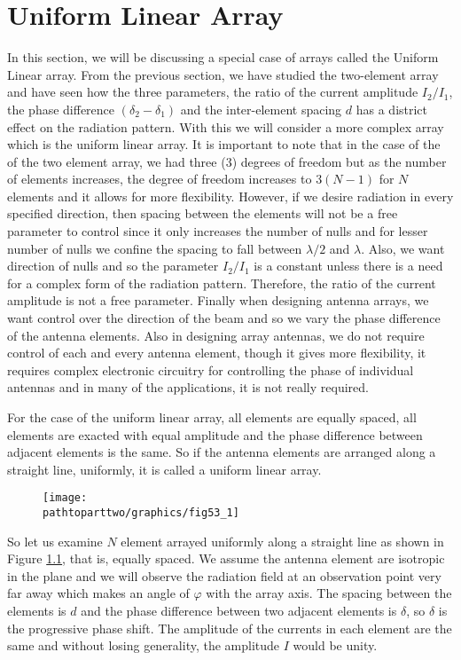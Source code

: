 \chapter{Uniform Linear Array}
In this section, we will be discussing a special case of arrays called the Uniform Linear array. From the previous section, we have studied the two-element array and have seen how the three parameters, the ratio of the current amplitude $I_{2} / I_{1}$, the phase difference $\left(\delta_2 - \delta_1\right)$ and the inter-element spacing $d$ has a district effect on the radiation pattern. With this we will consider a more complex array which is the uniform linear array. It is important to note that in the case of the of the two element array, we had three (3) degrees of freedom but as the number of elements increases, the degree of freedom increases to $3(N -1)$ for $N$ elements and it allows for more flexibility. However, if we desire radiation in every specified direction, then spacing between the elements will not be a free parameter to control since it only increases the number of nulls and for lesser number of nulls we confine the spacing to fall between $\lambda/2$ and $\lambda$. Also, we want direction of nulls and so the parameter $I_{2} / I_{1}$ is a constant unless there is a need for a complex form of the radiation pattern. Therefore, the ratio of the current amplitude is not a free parameter. Finally when designing antenna arrays, we want control over the direction of the beam and so we vary the phase difference of the antenna elements. Also in designing array antennas, we do not require control of each and every antenna element, though it gives more flexibility, it requires complex electronic circuitry for controlling the phase of individual antennas and in many of the applications, it is not really required.

For the case of the uniform linear array, all elements are equally spaced, all elements are exacted with equal amplitude and the phase difference between adjacent elements is the same. So if the antenna elements are arranged along a straight line, uniformly, it is called a uniform linear array.
\begin{figure}[h]
\centering
\texttt{[image: \\pathtoparttwo/graphics/fig53\_1]}
\caption{}
\label{53.1}
\end{figure}

So let us examine $N$ element arrayed uniformly along a straight line as shown in Figure \ref{53.1}, that is, equally spaced. We assume the antenna element are isotropic in the plane and we will observe the radiation field at an observation point very far away which makes an angle of $\varphi$ with the array axis. The spacing between the elements is $d$ and the phase difference between two adjacent elements is $\delta$, so $\delta$ is the progressive phase shift. The amplitude of the currents in each element are the same and without losing generality, the amplitude $I$ would be unity.

